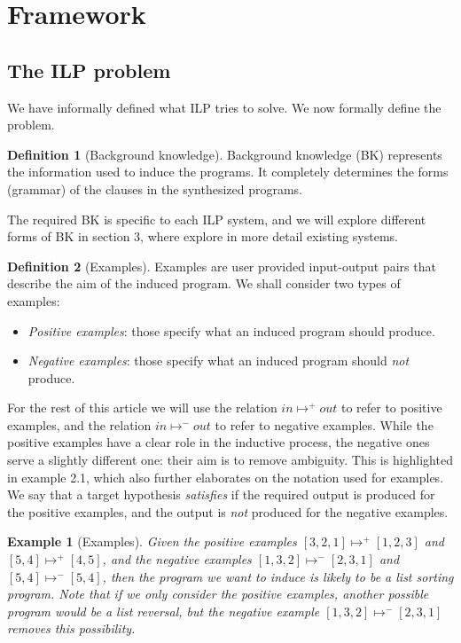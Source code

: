 \documentclass{article}
\newtheorem{example}{Example}
\theoremstyle{definition}
\newtheorem{defn}{Definition}[section]
\begin{document}
\section{Framework}
\subsection{The ILP problem}
We have informally defined what ILP tries to solve. We now formally define the problem.

\begin{defn}[Background knowledge]
Background knowledge (BK) represents the information used to induce the programs. It completely determines the forms (grammar) of the clauses in the synthesized programs.
\end{defn}
The required BK is specific to each ILP system, and we will explore different forms of BK in section 3, where explore in more detail existing systems.

\begin{defn}[Examples]
Examples are user provided input-output pairs that describe the aim of the induced program. We shall consider two types of examples:
\begin{itemize}
\item \textit{Positive examples}: those specify what an induced program should produce.
\item \textit{Negative examples}: those specify what an induced program should \emph{not} produce.
\end{itemize}
\end{defn}
For the rest of this article we will use the relation $in \mapsto^+ out$ to refer to positive examples, and the relation $in \mapsto^- out$ to refer to negative examples. While the positive examples have a clear role in the inductive process, the negative ones serve a slightly different one: their aim is to remove ambiguity. This is highlighted in example 2.1, which also further elaborates on the notation used for examples. We say that a target hypothesis \emph{satisfies} if the required output is produced for the positive examples, and the output is \emph{not} produced for the negative examples.

\begin{example}[Examples]
Given the positive examples $[3,2,1] \mapsto^+ [1,2,3]$ and $[5,4] \mapsto^+ [4,5]$, and the negative examples $[1,3,2] \mapsto^- [2,3,1]$ and $[5,4] \mapsto^- [5,4]$, then the program we want to induce is likely to be a list sorting program. Note that if we only consider the positive examples, another possible program would be a list reversal, but the negative example $[1,3,2] \mapsto^- [2,3,1]$ removes this possibility.
\end{example}
\end{document}

